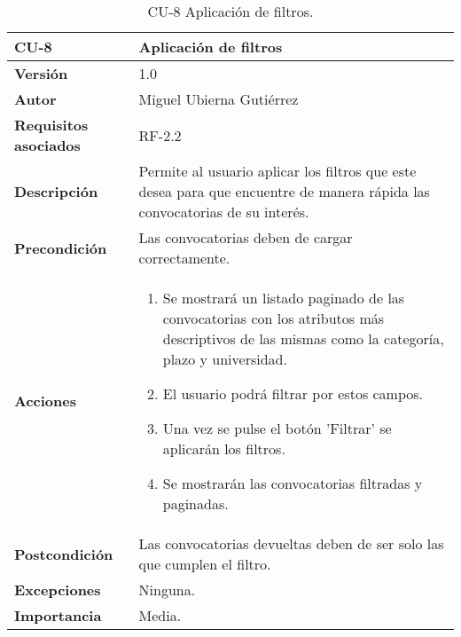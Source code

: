 \begin{table}[p]
	\centering
	\begin{tabularx}{\linewidth}{ p{} p{} }
		\toprule
		\textbf{CU-8}    & \textbf{Aplicación de filtros}\\
		\toprule
		\textbf{Versión}              & 1.0    \\
		\textbf{Autor}                & Miguel Ubierna Gutiérrez \\
		\textbf{Requisitos asociados} & RF-2.2 \\
		\textbf{Descripción}          & Permite al usuario aplicar los filtros que este desea para que encuentre de manera rápida las convocatorias de su interés.  \\
		\textbf{Precondición}         & Las convocatorias deben de cargar correctamente.\\
		\textbf{Acciones}             &
		\begin{enumerate}
			\def\labelenumi{\arabic{enumi}.}
			\tightlist
			\item Se mostrará un listado paginado de las convocatorias con los atributos más descriptivos de las mismas como la categoría, plazo y universidad.
                \item El usuario podrá filtrar por estos campos.
                \item Una vez se pulse el botón 'Filtrar' se aplicarán los filtros.
                \item Se mostrarán las convocatorias filtradas y paginadas.
		\end{enumerate}\\
		\textbf{Postcondición}        & Las convocatorias devueltas deben de ser solo las que cumplen el filtro. \\
		\textbf{Excepciones}          & Ninguna.  \\
		\textbf{Importancia}          & Media.  \\
		\bottomrule
	\end{tabularx}
	\caption{CU-8 Aplicación de filtros.}
\end{table}


